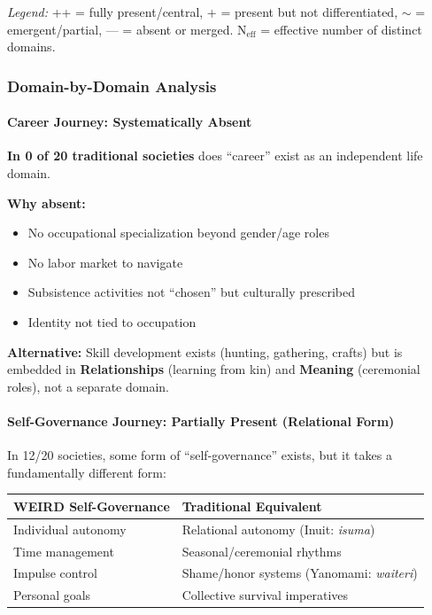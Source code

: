 \textit{Legend:} ++ = fully present/central, + = present but not differentiated, $\sim$ = emergent/partial, — = absent or merged. N$_{\text{eff}}$ = effective number of distinct domains.

\subsubsection{Domain-by-Domain Analysis}

\paragraph{Career Journey: Systematically Absent}

\begin{tcolorbox}[colback=red!5!white, colframe=red!75!black, title=Finding: ``Career'' is a WEIRD Construct]
\textbf{In 0 of 20 traditional societies} does ``career'' exist as an independent life domain.

\textbf{Why absent:}
\begin{itemize}[nosep]
\item No occupational specialization beyond gender/age roles
\item No labor market to navigate
\item Subsistence activities not ``chosen'' but culturally prescribed
\item Identity not tied to occupation
\end{itemize}

\textbf{Alternative:} Skill development exists (hunting, gathering, crafts) but is embedded in \textbf{Relationships} (learning from kin) and \textbf{Meaning} (ceremonial roles), not a separate domain.
\end{tcolorbox}

\paragraph{Self-Governance Journey: Partially Present (Relational Form)}

In 12/20 societies, some form of ``self-governance'' exists, but it takes a fundamentally different form:

\begin{center}
\begin{tabular}{@{}lp{6cm}@{}}
\toprule
\textbf{WEIRD Self-Governance} & \textbf{Traditional Equivalent} \\
\midrule
Individual autonomy & Relational autonomy (Inuit: \textit{isuma}) \\
Time management & Seasonal/ceremonial rhythms \\
Impulse control & Shame/honor systems (Yanomami: \textit{waiteri}) \\
Personal goals & Collective survival imperatives \\
\bottomrule
\end{tabular}
\end{center}


